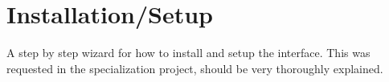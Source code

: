 \appendix
\chapter{Installation/Setup}

A step by step wizard for how to install and setup the interface. This was requested in the specialization project, should be very thoroughly explained.

\cleardoublepage
